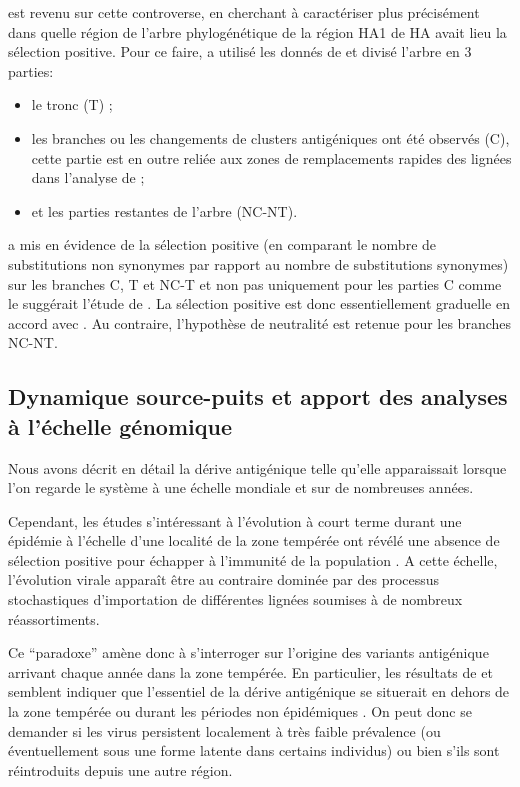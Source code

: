 \citet{Suzuki2008} est revenu sur cette controverse, en cherchant à
caractériser plus précisément dans quelle région de l'arbre
phylogénétique de la région HA1 de HA avait lieu la sélection
positive. Pour ce faire, \citet{Suzuki2008} a utilisé les donnés de
\citet{Smith2004} et divisé l'arbre en 3 parties:
\begin{itemize}
\item le tronc (T) ;
\item les branches ou les changements de clusters antigéniques ont été
  observés (C), cette partie est en outre reliée aux zones de
  remplacements rapides des lignées dans l'analyse de
  \citet{Wolf2006} ;
\item et les parties restantes de l'arbre (NC-NT).
\end{itemize}
\citet{Suzuki2008} a mis en évidence de la sélection positive (en
comparant le nombre de substitutions non synonymes par rapport au
nombre de substitutions synonymes) sur les branches C, T et NC-T et
non pas uniquement pour les parties C comme le suggérait l'étude de
\citet{Wolf2006}. La sélection positive est donc essentiellement
graduelle en accord avec \citet{Shih2007}. Au contraire, l'hypothèse
de neutralité est retenue pour les branches NC-NT.


\subsection{Dynamique source-puits et apport des analyses à l'échelle
  génomique}
\label{sec:intro:sourcesink}

Nous avons décrit en détail la dérive antigénique telle qu'elle
apparaissait lorsque l'on regarde le système à une échelle mondiale
et sur de nombreuses années.

Cependant, les études s'intéressant à l'évolution à court terme durant
une épidémie à l'échelle d'une localité de la zone tempérée ont révélé
une absence de sélection positive pour échapper à l'immunité de la
population \citep{Lavenu2006, Nelson2006}.  A cette échelle,
l'évolution virale apparaît être au contraire dominée par des
processus stochastiques d'importation de différentes lignées soumises
à de nombreux réassortiments.

Ce ``paradoxe'' amène donc à s'interroger sur l'origine des variants
antigénique arrivant chaque année dans la zone tempérée. En
particulier, les résultats de \citet{Lavenu2006} et \citet{Nelson2006}
semblent indiquer que l'essentiel de la dérive antigénique se
situerait en dehors de la zone tempérée ou durant les périodes non
épidémiques \citep{Gog2003}. On peut donc se demander si les virus
persistent localement à très faible prévalence (ou éventuellement sous
une forme latente dans certains individus) ou bien s'ils sont
réintroduits depuis une autre région.

